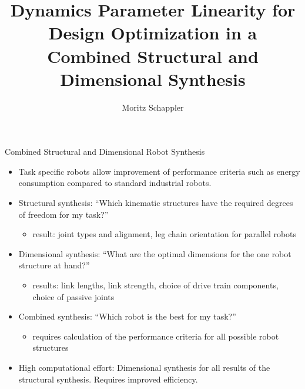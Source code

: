 \documentclass[c]{beamer}
\author[moritz.schappler@imes.uni-hannover.de]{Moritz Schappler}
\title{Dynamics Parameter Linearity for Design Optimization in a Combined Structural and Dimensional Synthesis}
\institute{Institute of Mechatronic Systems}
\newcommand{\postersubsection}[1]{%
\setlength\fboxsep{0pt}%
\vfil\penalty125\vfilneg\vskip1.5ex
\colorbox{Grau}{\parbox[b]{\columnwidth}{\vskip0.75ex%
\Large\hskip1ex #1%
\vskip0.75ex}}%
}
\begin{document}
\begin{frame}
\begin{block}{Combined Structural and Dimensional Robot Synthesis}
\parbox{\linewidth}{
\begin{multicols}{2}
\begin{itemize}
    \item Task specific robots allow improvement of performance criteria such as energy consumption compared to standard industrial robots.
    \item Structural synthesis: ``Which kinematic structures have the required degrees of freedom for my task?'' 
    \begin{itemize}
    \item result: joint types and alignment, leg chain orientation for parallel robots
    \end{itemize}
    \item Dimensional synthesis: ``What are the optimal dimensions for the one robot structure at hand?'' 
    \begin{itemize}
        \item results: link lengths, link strength, choice of drive train components, choice of passive joints
    \end{itemize}
    \item Combined synthesis: ``Which robot is the best for my task?''
    \begin{itemize}
        \item requires calculation of the performance criteria for all possible robot structures
    \end{itemize}
    \item High computational effort: Dimensional synthesis for all results of the structural synthesis. Requires improved efficiency.
\end{itemize}

\begin{figure}[t]
    \centering
	
\end{figure}



\end{multicols}}
\end{block}
\end{frame}
\end{document}
